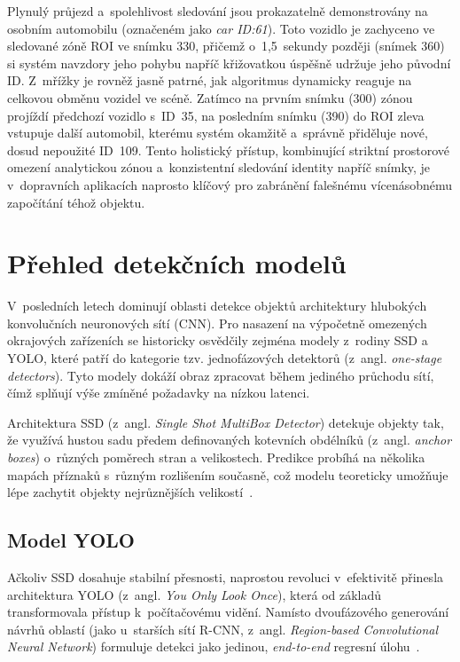 Plynulý průjezd a~spolehlivost sledování jsou prokazatelně demonstrovány na osobním automobilu (označeném jako \textit{car ID:61}). Toto vozidlo je zachyceno ve sledované zóně ROI ve snímku 330, přičemž o~1,5~sekundy později (snímek 360) si systém navzdory jeho pohybu napříč křižovatkou úspěšně udržuje jeho původní ID. Z~mřížky je rovněž jasně patrné, jak algoritmus dynamicky reaguje na celkovou obměnu vozidel ve scéně. Zatímco na prvním snímku (300) zónou projíždí předchozí vozidlo s~ID~35, na posledním snímku (390) do ROI zleva vstupuje další automobil, kterému systém okamžitě a~správně přiděluje nové, dosud nepoužité ID~109. Tento holistický přístup, kombinující striktní prostorové omezení analytickou zónou a~konzistentní sledování identity napříč snímky, je v~dopravních aplikacích naprosto klíčový pro zabránění falešnému vícenásobnému započítání téhož objektu.

\section{Přehled detekčních modelů}
V~posledních letech dominují oblasti detekce objektů architektury hlubokých konvolučních neuronových sítí (\acs{CNN}). Pro nasazení na výpočetně omezených okrajových zařízeních se historicky osvědčily zejména modely z~rodiny SSD a YOLO, které patří do kategorie tzv. jednofázových detektorů (z~angl. \textit{one-stage detectors}). Tyto modely dokáží obraz zpracovat během jediného průchodu sítí, čímž splňují výše zmíněné požadavky na nízkou latenci.

Architektura \acs{SSD} (z~angl. \textit{Single Shot MultiBox Detector}) detekuje objekty tak, že využívá hustou sadu předem definovaných kotevních obdélníků (z~angl. \textit{anchor boxes}) o~různých poměrech stran a velikostech. Predikce probíhá na několika mapách příznaků s~různým rozlišením současně, což modelu teoreticky umožňuje lépe zachytit objekty nejrůznějších velikostí~\cite{szeliski_computer_vision}.


\subsection{Model YOLO}
Ačkoliv SSD dosahuje stabilní přesnosti, naprostou revoluci v~efektivitě přinesla architektura \acs{YOLO} (z~angl. \textit{You Only Look Once}), která od základů transformovala přístup k~počítačovému vidění. Namísto dvoufázového generování návrhů oblastí (jako u~starších sítí \acs{R-CNN}, z~angl. \textit{Region-based Convolutional Neural Network}) formuluje detekci jako jedinou, \textit{end-to-end} regresní úlohu~\cite{redmon_yolo_2016}.

